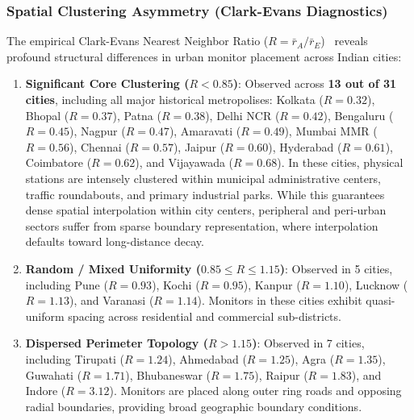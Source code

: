 \documentclass[conference]{IEEEtran}
\begin{document}
\subsubsection{Spatial Clustering Asymmetry (Clark-Evans Diagnostics)}
The empirical Clark-Evans Nearest Neighbor Ratio ($R = \bar{r}_A / \bar{r}_E$)~\cite{clark1954distance} reveals profound structural differences in urban monitor placement across Indian cities:
\begin{enumerate}
    \item \textbf{Significant Core Clustering ($R < 0.85$)}: Observed across \textbf{13 out of 31 cities}, including all major historical metropolises: Kolkata ($R = 0.32$), Bhopal ($R = 0.37$), Patna ($R = 0.38$), Delhi NCR ($R = 0.42$), Bengaluru ($R = 0.45$), Nagpur ($R = 0.47$), Amaravati ($R = 0.49$), Mumbai MMR ($R = 0.56$), Chennai ($R = 0.57$), Jaipur ($R = 0.60$), Hyderabad ($R = 0.61$), Coimbatore ($R = 0.62$), and Vijayawada ($R = 0.68$). In these cities, physical stations are intensely clustered within municipal administrative centers, traffic roundabouts, and primary industrial parks. While this guarantees dense spatial interpolation within city centers, peripheral and peri-urban sectors suffer from sparse boundary representation, where interpolation defaults toward long-distance decay.
    \item \textbf{Random / Mixed Uniformity ($0.85 \le R \le 1.15$)}: Observed in 5 cities, including Pune ($R = 0.93$), Kochi ($R = 0.95$), Kanpur ($R = 1.10$), Lucknow ($R = 1.13$), and Varanasi ($R = 1.14$). Monitors in these cities exhibit quasi-uniform spacing across residential and commercial sub-districts.
    \item \textbf{Dispersed Perimeter Topology ($R > 1.15$)}: Observed in 7 cities, including Tirupati ($R = 1.24$), Ahmedabad ($R = 1.25$), Agra ($R = 1.35$), Guwahati ($R = 1.71$), Bhubaneswar ($R = 1.75$), Raipur ($R = 1.83$), and Indore ($R = 3.12$). Monitors are placed along outer ring roads and opposing radial boundaries, providing broad geographic boundary conditions.
\end{enumerate}
\end{document}
